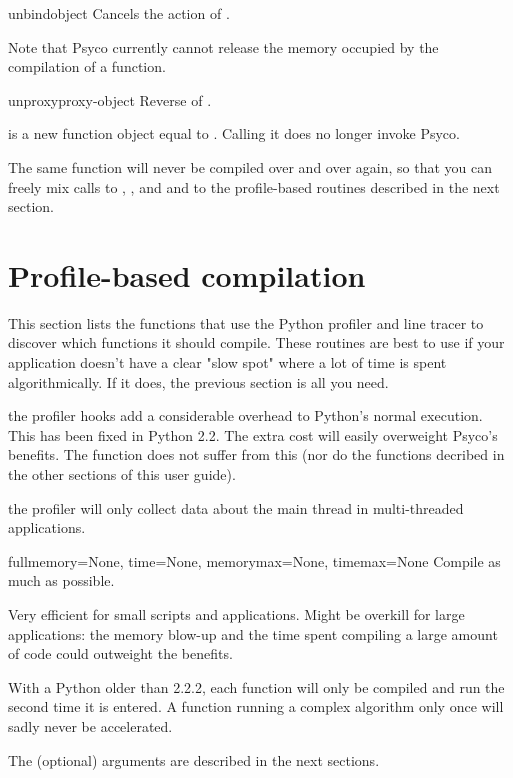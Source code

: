 \documentclass{manual}
\begin{document}
\begin{funcdesc}{unbind}{object}
  Cancels the action of .

  Note that Psyco currently cannot release the memory occupied by the compilation of a function.
\end{funcdesc}

\begin{funcdesc}{unproxy}{proxy-object}
  Reverse of .

   is a new function object equal to .  Calling it does no longer invoke Psyco.
\end{funcdesc}

The same function will never be compiled over and over again, so that you can freely mix calls to , ,  and  and to the profile-based routines described in the next section.


\section{Profile-based compilation}

This section lists the functions that use the Python profiler and line tracer to discover which functions it should compile.  These routines are best to use if your application doesn't have a clear "slow spot" where a lot of time is spent algorithmically.  If it does, the previous section is all you need.

 the profiler hooks add a considerable overhead to Python's normal execution.  This has been fixed in Python 2.2.  The extra cost will easily overweight Psyco's benefits.  The function  does not suffer from this (nor do the functions decribed in the other sections of this user guide).

 the profiler will only collect data about the main thread in multi-threaded applications.

\begin{funcdesc}{full}{memory=None, time=None, memorymax=None, timemax=None}
  Compile as much as possible.

  Very efficient for small scripts and applications.  Might be overkill for large applications: the memory blow-up and the time spent compiling a large amount of code could outweight the benefits.

  With a Python older than 2.2.2, each function will only be compiled and run the second time it is entered.  A function running a complex algorithm only once will sadly never be accelerated.

  The (optional) arguments are described in the next sections.
\end{funcdesc}
\end{document}
